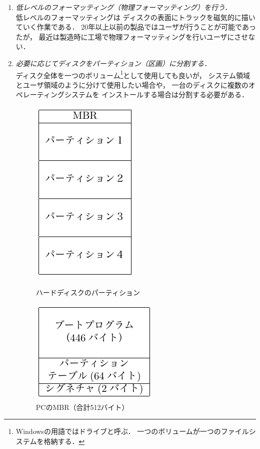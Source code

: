 \begin{enumerate}
\item \emph{低レベルのフォーマッティング（物理フォーマッティング）を行う．}\\
  低レベルのフォーマッティングは
  ディスクの表面にトラックを磁気的に描いていく作業である．
  20年以上以前の製品ではユーザが行うことが可能であったが，
  最近は製造時に工場で物理フォーマッティングを行いユーザにさせない．
\item \emph{必要に応じてディスクをパーティション（区画）に分割する．}\\
  ディスク全体を一つのボリューム\footnote{
    Windowsの用語ではドライブと呼ぶ．
    一つのボリュームが一つのファイルシステムを格納する．
  }として使用しても良いが，
  システム領域とユーザ領域のように分けて使用したい場合や，
  一台のディスクに複数のオペレーティングシステムを
  インストールする場合は分割する必要がある．

  \begin{figure}[btp]
    \begin{center}
      \begin{minipage}{0.49\columnwidth}
        \centerline{\includegraphics[scale=1.0]{Fig/hddPartition.pdf}}
        \caption{ハードディスクのパーティション}\label{fig:hddPartition}
      \end{minipage}
      \begin{minipage}{0.49\columnwidth}
        \centerline{\includegraphics[scale=1.0]{Fig/masterBootRecord.pdf}}
        \caption{PCのMBR（合計512バイト）}\label{fig:masterBootRecord}
      \end{minipage}
    \end{center}
  \end{figure}


\end{enumerate}
